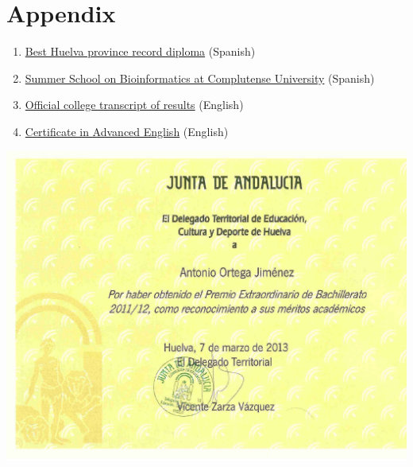\documentclass[letterpaper]{article}
\begin{document}
\section*{Appendix}
\begin{enumerate}


\item \hyperlink{premio_extraordinario}{Best Huelva province record diploma} (Spanish)
\item \hyperlink{complu}{Summer School on Bioinformatics at Complutense University} (Spanish)
\item \hyperlink{exp-en}{Official college transcript of results} (English)
\item \hyperlink{cae}{Certificate in Advanced English} (English)
\end{enumerate}
%


%


\thispagestyle{empty}
\hypertarget{premio_extraordinario}{}
\begin{landscape}
\centering
\includegraphics[scale=0.9]{./premio_extraordinario.pdf}
\end{landscape}
\restoregeometry
\clearpage
\end{document}
